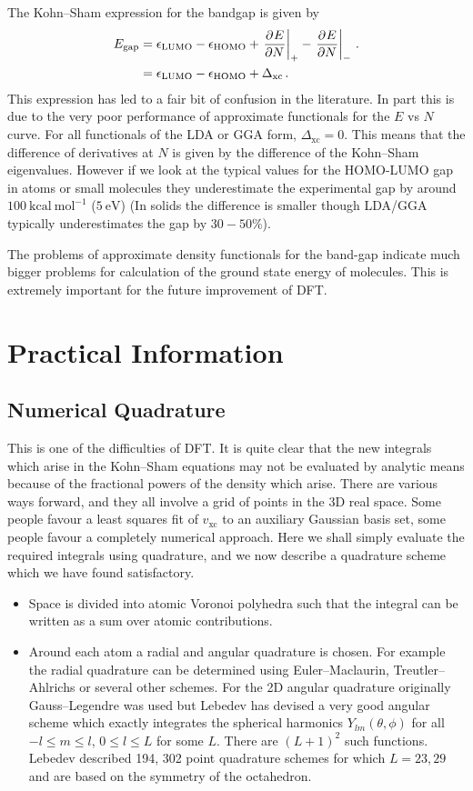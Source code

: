\documentclass{article}
\theoremstyle{plain}\theoremheaderfont{\normalfont\itshape}\theorembodyfont{\rmfamily}\theoremseparator{.}\newtheorem*{rem}{Remark}\newtheorem*{ex}{Example}\newtheorem*{proof}{Proof}\newtheorem*{altp}{Alternative proof}
\theoremstyle{plain}\theoremheaderfont{\normalfont\bfseries}\theorembodyfont{\rmfamily}\theoremseparator{.}\newtheorem{thm}{Theorem}[section]\newtheorem{lem}[thm]{Lemma}\newtheorem{prop}[thm]{Proposition}\newtheorem*{cor}{Corollary}\newtheorem{defn}[thm]{Definition}\newtheorem{clm}[thm]{Claim}\newtheorem{clminproof}{Claim}
\theoremstyle{break}\theoremheaderfont{\normalfont\itshape}\theorembodyfont{\rmfamily}\theoremseparator{.\medskip}\newtheorem*{proofskip}{Proof}\newtheorem*{exs}{Examples}\newtheorem*{rems}{Remarks}
\theoremstyle{break}\theoremheaderfont{\normalfont\bfseries}\theorembodyfont{\rmfamily}\theoremseparator{.\medskip}\newtheorem{lemskip}[thm]{Lemma}\newtheorem{defnskip}[thm]{Definition}\newtheorem{propskip}[thm]{Proposition}\newtheorem{thmskip}[thm]{Theorem}
\numberwithin{equation}{section}
\newcommand{\unit}[1]{\ \mathrm{#1}}
\newcommand{\pdv}[3][]{\frac{\partial^{#1} #2}{{\partial #3}^{#1}}}
\newcommand{\xc}{_{\text{xc}}}
\begin{document}
    The Kohn--Sham expression for the bandgap is given by
    \begin{align}
        E_{\text{gap}}&=\epsilon_{\text{LUMO}}-\epsilon_{\text{HOMO}}+\left.\pdv{E}{N}\right|_{+}-\left.\pdv{E}{N}\right|_{-}\,.\notag\\
        &=\epsilon_{\text{LUMO}}-\epsilon_{\text{HOMO}}+\Delta\xc\,.
    \end{align}
    This expression has led to a fair bit of confusion in the literature. In part this is due to the very poor performance of approximate functionals for the \(E\) vs \(N\) curve. For all functionals of the LDA or GGA form, \(\Delta\xc=0\). This means that the difference of derivatives at \(N\) is given by the difference of the Kohn--Sham eigenvalues. However if we look at the typical values for the HOMO-LUMO gap in atoms or small molecules they underestimate the experimental gap by around \(100\unit{kcal}\unit{mol}^{-1}\) (\(5\unit{eV}\)) (In solids the difference is smaller though LDA/GGA typically underestimates the gap by \(30-50\%\)).

    The problems of approximate density functionals for the band-gap indicate much bigger problems for calculation of the ground state energy of molecules. This is extremely important for the future improvement of DFT.

    \newpage
    \section{Practical Information}
    \subsection{Numerical Quadrature}
    This is one of the difficulties of DFT. It is quite clear that the new integrals which arise in the Kohn--Sham equations may not be evaluated by analytic means because of the fractional powers of the density which arise. There are various ways forward, and they all involve a grid of points in the 3D real space. Some people favour a least squares fit of \(v_{\text{xc}}\) to an auxiliary Gaussian basis set, some people favour a completely numerical approach. Here we shall simply evaluate the required integrals using quadrature, and we now describe a quadrature scheme which we have found satisfactory.
    \begin{itemize}
        \item Space is divided into atomic Voronoi polyhedra such that the integral can be written as a sum over atomic contributions.
        \item Around each atom a radial and angular quadrature is chosen. For example the radial quadrature can be determined using Euler--Maclaurin, Treutler--Ahlrichs or several other schemes. For the 2D angular quadrature originally Gauss--Legendre was used but Lebedev has devised a very good angular scheme which exactly integrates the spherical harmonics \(Y_{lm}(\theta,\phi)\) for all \(-l\le m\le l\), \(0\le l\le L\) for some \(L\). There are \((L+1)^2\) such functions. Lebedev described 194, 302 point quadrature schemes for which \(L=23,29\) and are based on the symmetry of the octahedron.
    \end{itemize}
\end{document}
